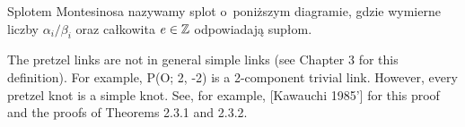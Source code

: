 \begin{definition}
%
    Splotem Montesinosa nazywamy splot o~poniższym diagramie, gdzie wymierne liczby $\alpha_i/\beta_i$ oraz całkowita $e \in \mathbb Z$ odpowiadają supłom.
\begin{comment}
    \[
    \begin{tikzpicture}[baseline=-0.65ex, scale=0.1]
        \draw[semithick] (-5, 5) rectangle (5, 15);
        \foreach \x in {0,1,3,4} {
            \draw[semithick] (15*\x-35, -15) rectangle (15*\x-25, -5);
        }
        \foreach \x in {0,1,2,3,4,5} {
            \draw[semithick] (15*\x-35, -8) to (15*\x-40, -8);
            \draw[semithick] (15*\x-35, -12) to (15*\x-40, -12);
        }
        \draw[semithick] (-40, -8) [in=down, out=left] to (-45, -3);
        \draw[semithick] (-40, -12) [in=down, out=left] to (-49, -3);

        \draw[semithick] (-40, 8) [in=up, out=left] to (-45, 3);
        \draw[semithick] (-40, 12) [in=up, out=left] to (-49, 3);

        \draw[semithick] (40, 8) [in=up, out=right] to (45, 3);
        \draw[semithick] (40, 12) [in=up, out=right] to (49, 3);

        \draw[semithick] (40, -8) [in=down, out=right] to (45, -3);
        \draw[semithick] (40, -12) [in=down, out=right] to (49, -3);

        \draw[semithick] (-45, -3)  to (-45, 3);
        \draw[semithick] (-49, -3)  to (-49, 3);
        \draw[semithick] (45, -3)  to (45, 3);
        \draw[semithick] (49, -3)  to (49, 3);

        \draw[semithick] (-5, 8)  to (-40, 8);
        \draw[semithick] ( 5, 8)  to ( 40, 8);
        \draw[semithick] (-5, 12)  to (-40, 12);
        \draw[semithick] ( 5, 12)  to ( 40, 12);

        \node at (0, 10) {e};
        \node at (0, -10) {\ldots};
        \node at (-15, -10) {$\displaystyle \frac{\alpha_2}{\beta_2}$};
        \node at (-30, -10) {$\displaystyle \frac{\alpha_1}{\beta_1}$};
        \node at (15, -10) {$\displaystyle \frac{\alpha_{n-1}}{\beta_{n-1}}$};
        \node at (30, -10) {$\displaystyle \frac{\alpha_n}{\beta_n}$};
    \end{tikzpicture}
    \]
\end{comment}
\end{definition}

\begin{tobedone}
The pretzel links are not in general simple links (see Chapter 3 for this definition). For example, P(O; 2, -2) is a 2-component trivial link. However, every pretzel knot is a simple knot. See, for example, [Kawauchi 1985'] for this proof and the proofs of Theorems 2.3.1 and 2.3.2.
\end{tobedone}

